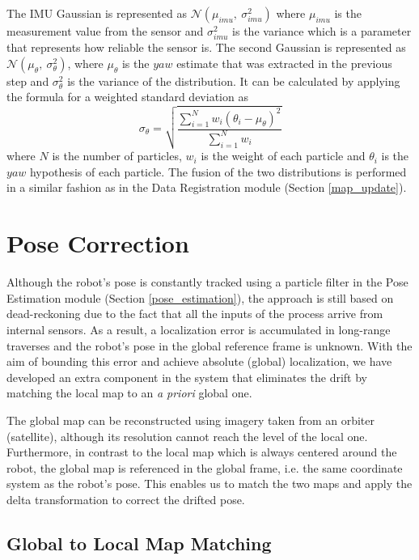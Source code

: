 The IMU Gaussian is represented as $\mathcal{N}(\mu_{imu} ,\ \sigma^2_{imu})$
where $\mu_{imu}$ is the measurement value from the sensor and
$\sigma^2_{imu}$ is the variance which is a parameter that represents how
reliable the sensor is.
The second Gaussian is represented as
$\mathcal{N}(\mu_{\theta} ,\ \sigma^2_{\theta})$,
where $\mu_{\theta}$ is the $yaw$ estimate that was extracted in the
previous step and $\sigma^2_{\theta}$ is the variance of the distribution.
It can be calculated by applying the formula for a weighted standard
deviation as
\begin{equation}
    \sigma_\theta = \sqrt{\frac
    {\sum\limits^{N}_{i=1} w_i (\theta_i - \mu_\theta)^2}
    {\sum\limits^{N}_{i=1} w_i}}
\end{equation}
where
$N$ is the number of particles,
$w_i$ is the weight of each particle and
$\theta_i$ is the $yaw$ hypothesis of each particle.
The fusion of the two distributions is performed in a similar fashion as
in the Data Registration module (Section \ref{map_update}).

\section{Pose Correction} \label{pose_correction}

Although the robot's pose is constantly tracked using a particle filter in the
Pose Estimation module (Section \ref{pose_estimation}), the approach
is still based on dead-reckoning due to the fact that all the inputs
of the process arrive from internal sensors.
As a result, a localization error is accumulated in long-range traverses
and the robot's pose in the global reference frame is unknown.
With the aim of bounding this error and achieve absolute (global) localization,
we have developed an extra component in the system that eliminates
the drift by matching the local map to an \textit{a priori} global one.

The global map can be reconstructed using imagery taken from an
orbiter (satellite), although its resolution cannot reach the level of
the local one.
Furthermore, in contrast to the local map which is always centered around
the robot, the global map is referenced in the global frame, i.e. the
same coordinate system as the robot's pose.
This enables us to match the two maps and apply the delta transformation
to correct the drifted pose.

\subsection{Global to Local Map Matching} \label{map_matching}

